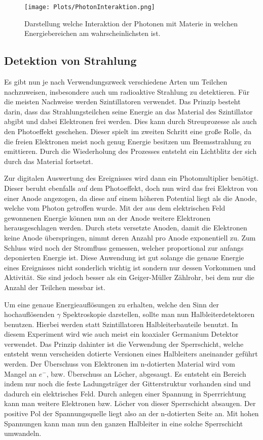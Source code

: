 \documentclass[]{article}
\begin{document}
	\begin{figure}[H]
		\centering
		\texttt{[image: Plots/PhotonInteraktion.png]}
		\caption{Darstellung welche Interaktion der Photonen mit Materie in welchen Energiebereichen am wahrscheinlichsten ist. }
	\end{figure}
	
	\subsection{Detektion von Strahlung}
	Es gibt nun je nach Verwendungszweck verschiedene Arten um Teilchen nachzuweisen, insbesondere auch um radioaktive Strahlung zu detektieren. Für die meisten Nachweise werden Szintillatoren verwendet. Das Prinzip besteht darin, dass das Strahlungsteilchen seine Energie an das Material des Szintillator abgibt und dabei Elektronen frei werden. Dies kann durch Streuprozesse als auch den Photoeffekt geschehen. Dieser spielt im zweiten Schritt eine große Rolle, da die freien Elektronen meist noch genug Energie besitzen um Bremsstrahlung zu emittieren. Durch die Wiederholung des Prozesses entsteht ein Lichtblitz der sich durch das Material fortsetzt. 
	
	Zur digitalen Auswertung des Ereignisses wird dann ein Photomultiplier benötigt. Dieser beruht ebenfalls auf dem Photoeffekt, doch nun wird das frei Elektron von einer Anode angezogen, da diese auf einem höheren Potential liegt als die Anode, welche vom Photon getroffen wurde. Mit der aus dem elektrischen Feld gewonnenen Energie können nun an der Anode weitere Elektronen herausgeschlagen werden. Durch stets versetzte Anoden, damit die Elektronen keine Anode überspringen, nimmt deren Anzahl pro Anode exponentiell zu. Zum Schluss wird noch der Stromfluss gemessen, welcher proportional zur anfangs deponierten Energie ist. Diese Anwendung ist gut solange die genaue Energie eines Ereignisses nicht sonderlich wichtig ist sondern nur dessen Vorkommen und Aktivität. Sie sind jedoch besser als ein Geiger-Müller Zählrohr, bei dem nur die Anzahl der Teilchen messbar ist.
	
	Um eine genaue Energieauflösungen zu erhalten, welche den Sinn der hochauflösenden $\gamma$ Spektroskopie darstellen, sollte man nun Halbleiterdetektoren benutzen. Hierbei 
	werden statt Szintillatoren Halbleiterbauteile benutzt. In diesem Experiment wird wie auch meist ein koaxialer Germanium Detektor verwendet. Das Prinzip dahinter ist die Verwendung der Sperrschicht, welche entsteht wenn verscheiden dotierte Versionen eines Halbleiters aneinander geführt werden. Der Überschuss von Elektronen im n-dotierten Material wird vom Mangel an $e^-$, bzw. Überschuss an Löcher, abgesaugt. Es entsteht ein Bereich indem nur noch die feste Ladungsträger der Gitterstruktur vorhanden sind und dadurch ein elektrisches Feld. Durch anlegen einer Spannung in Sperrrichtung kann man weitere Elektronen bzw. Löcher von dieser Sperrschicht absaugen. Der positive Pol der Spannungsquelle liegt also an der n-dotierten Seite an. Mit hohen Spannungen kann man nun den ganzen Halbleiter in eine solche Sperrschicht umwandeln.
	
\end{document}
